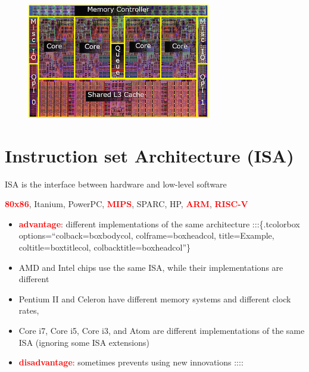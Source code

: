 \documentclass[
  12pt,
  a4paper,
]{report}
\providecommand{\tightlist}{%
  \setlength{\itemsep}{0pt}\setlength{\parskip}{0pt}}\usepackage{longtable,booktabs,array}
\begin{document}
\begin{figure}[H]
\begin{minipage}{0.50\linewidth}
\end{minipage}%
%
\begin{minipage}{0.50\linewidth}
\includegraphics[width=8cm,height=\textheight]{lecture1-3/images/corei7diagram.png}\end{minipage}%

\end{figure}%

\chapter{Instruction set Architecture
(ISA)}\label{instruction-set-architecture-isa}

ISA is the interface between hardware and low-level software

\begin{tcolorbox}[colback=boxbodycol, colframe=boxheadcol, title=Some modern instruction set architectures:, coltitle=boxtitlecol, colbacktitle=boxheadcol]
\textcolor{red}{\textbf{80x86}}, Itanium, PowerPC,
\textcolor{red}{\textbf{MIPS}}, SPARC, HP,
\textcolor{red}{\textbf{ARM}}, \textcolor{red}{\textbf{RISC-V}}

\end{tcolorbox}

\begin{tcolorbox}[colback=boxbodycol, colframe=boxheadcol, title=Issues with a fixed ISA:, coltitle=boxtitlecol, colbacktitle=boxheadcol]

\begin{itemize}
\tightlist
\item
  \textcolor{red}{\textbf{advantage}}: different implementations of the
  same architecture :::\{.tcolorbox options=``colback=boxbodycol,
  colframe=boxheadcol, title=Example, coltitle=boxtitlecol,
  colbacktitle=boxheadcol''\}
\item
  AMD and Intel chips use the same ISA, while their implementations are
  different
\item
  Pentium II and Celeron have different memory systems and different
  clock rates,
\item
  Core i7, Core i5, Core i3, and Atom are different implementations of
  the same ISA (ignoring some ISA extensions)
\end{itemize}

\end{tcolorbox}

\begin{itemize}
\tightlist
\item
  \textcolor{red}{\textbf{disadvantage}}: sometimes prevents using new
  innovations ::::
\end{itemize}
\end{document}
